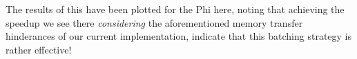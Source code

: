 

The results of this have been plotted for the Phi here, noting that achieving
the speedup we see there \emph{considering} the aforementioned memory transfer
hinderances of our current implementation, indicate that this batching strategy
is rather effective!
